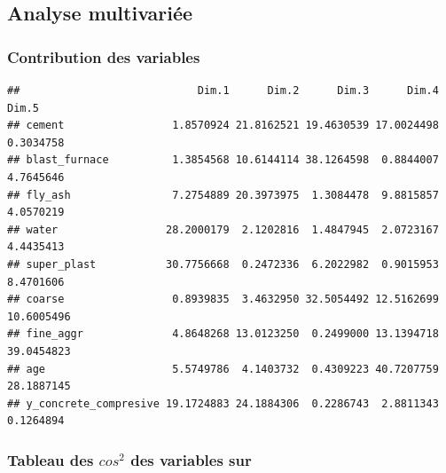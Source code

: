 \documentclass[
  12pt,
]{article}
\newenvironment{Shaded}{\begin{snugshade}}{\end{snugshade}}
\newcommand{\AttributeTok}[1]{\textcolor[rgb]{0.13,0.29,0.53}{#1}}
\newcommand{\CommentTok}[1]{\textcolor[rgb]{0.56,0.35,0.01}{\textit{#1}}}
\newcommand{\FloatTok}[1]{\textcolor[rgb]{0.00,0.00,0.81}{#1}}
\newcommand{\FunctionTok}[1]{\textcolor[rgb]{0.13,0.29,0.53}{\textbf{#1}}}
\newcommand{\NormalTok}[1]{#1}
\newcommand{\OtherTok}[1]{\textcolor[rgb]{0.56,0.35,0.01}{#1}}
\newcommand{\SpecialCharTok}[1]{\textcolor[rgb]{0.81,0.36,0.00}{\textbf{#1}}}
\begin{document}
\subsection{Analyse multivariée}\label{analyse-multivariuxe9e-1}

\subsubsection{Contribution des
variables}\label{contribution-des-variables}

\begin{Shaded}
\end{Shaded}

\begin{verbatim}
##                            Dim.1      Dim.2      Dim.3      Dim.4      Dim.5
## cement                 1.8570924 21.8162521 19.4630539 17.0024498  0.3034758
## blast_furnace          1.3854568 10.6144114 38.1264598  0.8844007  4.7645646
## fly_ash                7.2754889 20.3973975  1.3084478  9.8815857  4.0570219
## water                 28.2000179  2.1202816  1.4847945  2.0723167  4.4435413
## super_plast           30.7756668  0.2472336  6.2022982  0.9015953  8.4701606
## coarse                 0.8939835  3.4632950 32.5054492 12.5162699 10.6005496
## fine_aggr              4.8648268 13.0123250  0.2499000 13.1394718 39.0454823
## age                    5.5749786  4.1403732  0.4309223 40.7207759 28.1887145
## y_concrete_compresive 19.1724883 24.1884306  0.2286743  2.8811343  0.1264894
\end{verbatim}

\subsubsection{\texorpdfstring{Tableau des \(cos^2\) des variables
sur}{Tableau des cos\^{}2 des variables sur}}\label{tableau-des-cos2-des-variables-sur}

\begin{Shaded}
\end{Shaded}
\end{document}

